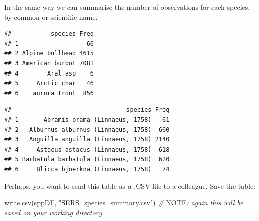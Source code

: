 \documentclass[
  10pt,
]{article}
\newenvironment{Shaded}{\begin{snugshade}}{\end{snugshade}}
\newcommand{\AlertTok}[1]{\textcolor[rgb]{0.94,0.16,0.16}{#1}}
\newcommand{\CommentTok}[1]{\textcolor[rgb]{0.56,0.35,0.01}{\textit{#1}}}
\newcommand{\DecValTok}[1]{\textcolor[rgb]{0.00,0.00,0.81}{#1}}
\newcommand{\FunctionTok}[1]{\textcolor[rgb]{0.00,0.00,0.00}{#1}}
\newcommand{\NormalTok}[1]{#1}
\newcommand{\OtherTok}[1]{\textcolor[rgb]{0.56,0.35,0.01}{#1}}
\newcommand{\SpecialCharTok}[1]{\textcolor[rgb]{0.00,0.00,0.00}{#1}}
\newcommand{\StringTok}[1]{\textcolor[rgb]{0.31,0.60,0.02}{#1}}
\begin{document}
In the same way we can summarise the number of observations for each species, by common or scientific name.

\begin{Shaded}
\end{Shaded}

\begin{verbatim}
##           species Freq
## 1                   66
## 2 Alpine bullhead 4615
## 3 American burbot 7081
## 4        Aral asp    6
## 5     Arctic char   46
## 6    aurora trout  856
\end{verbatim}

\begin{Shaded}
\end{Shaded}

\begin{verbatim}
##                                species Freq
## 1       Abramis brama (Linnaeus, 1758)   61
## 2   Alburnus alburnus (Linnaeus, 1758)  660
## 3   Anguilla anguilla (Linnaeus, 1758) 2140
## 4     Astacus astacus (Linnaeus, 1758)  618
## 5 Barbatula barbatula (Linnaeus, 1758)  620
## 6     Blicca bjoerkna (Linnaeus, 1758)   74
\end{verbatim}

Perhaps, you want to send this table as a .CSV file to a colleague. Save the table:

\begin{Shaded}
\begin{Highlighting}[]
\FunctionTok{write.csv}\NormalTok{(sppDF, }\StringTok{"SERS\_species\_summary.csv"}\NormalTok{)}
\CommentTok{\# }\AlertTok{NOTE}\CommentTok{: again this will be saved on your working directory}
\end{Highlighting}
\end{Shaded}
\end{document}
